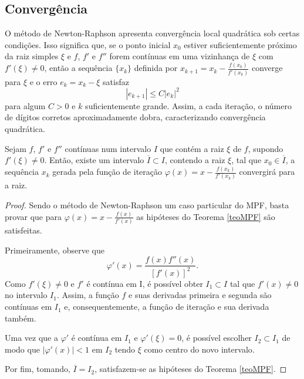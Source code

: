 \subsection{Convergência}
O método de Newton-Raphson apresenta convergência local quadrática sob certas condições. Isso significa que, se o ponto inicial $x_0$ estiver suficientemente próximo da raiz simples $\xi$ e $f$, $f'$ e $f''$ forem contínuas em uma vizinhança de $\xi$ com $f'(\xi) \neq 0$, então a sequência $\{x_k\}$ definida por $x_{k+1} = x_k - \frac{f(x_k)}{f'(x_k)}$ converge para $\xi$ e o erro $e_{k} = x_k - \xi$ satisfaz
\[
|e_{k+1}| \leq C |e_k|^2
\]
para algum $C > 0$ e $k$ suficientemente grande. Assim, a cada iteração, o número de dígitos corretos aproximadamente dobra, caracterizando convergência quadrática.
\begin{teo} \label{teoNR}
    Sejam $f$, $f'$ e $f''$ contínuas num intervalo $I$ que contém a raiz $\xi$ de $f$, supondo $f'(\xi) \neq 0$. Então, existe um intervalo $\overline{I} \subset I$, contendo a raiz $\xi$, tal que $x_0 \in \overline{I}$, a sequência ${x_k}$ gerada pela função de iteração $\varphi(x) = x - \frac{f(x_k)}{f'(x_k)}$ convergirá para a raiz.
\end{teo}
\begin{proof}
    Sendo o método de Newton-Raphson um caso particular do MPF, basta provar que para $\varphi(x) = x - \frac{f(x)}{f'(x)}$ as hipóteses do Teorema \ref{teoMPF} são satisfeitas. 
    
    Primeiramente, observe que 
    \begin{equation} \label{dphiNR}
        \varphi'(x) = \frac{f(x)f''(x)}{[f'(x)]^2}.
    \end{equation}
    Como $f'(\xi) \neq 0$ e $f'$ é contínua em I, é possível obter $I_1 \subset I$ tal que $f'(x) \neq 0$ no intervalo $I_1$. Assim, a função $f$ e suas derivadas primeira e segunda são contínuas em $I_1$ e, consequentemente, a função de iteração e sua derivada também.
    
     Uma vez que a $\varphi'$ é contínua em $I_1$ e $\varphi'(\xi) = 0$, é possível escolher $I_2 \subset I_1$ de modo que $|\varphi'(x)| < 1$ em $I_2$ tendo $\xi$ como centro do novo intervalo.

    Por fim, tomando, $\overline{I} = I_2$, satisfazem-se as hipóteses do Teorema \ref{teoMPF}.
\end{proof}
